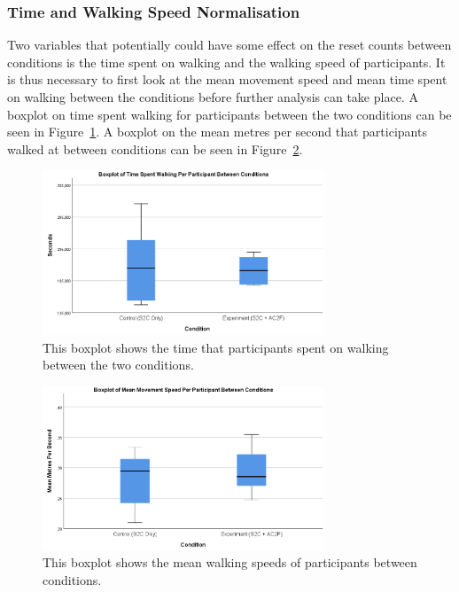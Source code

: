 \subsubsection{Time and Walking Speed Normalisation}
Two variables that potentially could have some effect on the reset counts between conditions is the time spent on walking and the walking speed of participants. It is thus necessary to first look at the mean movement speed and mean time spent on walking between the conditions before further analysis can take place. A boxplot on time spent walking for participants between the two conditions can be seen in Figure~\ref{fig:TimeSpentWalkingBetweenConditions}. A boxplot on the mean metres per second that participants walked at between conditions can be seen in Figure~\ref{fig:ex2mps}.

\begin{figure}[tbph]
    \centering
    \includegraphics[width=0.75\textwidth]{figures/graphs/TimeSpentWalkingBetweenConditionsBoxPlot.png}
    \caption[Boxplot of Time Spent Walking Between Conditions in Experiment 2]{This boxplot shows the time that participants spent on walking between the two conditions.}
    \label{fig:TimeSpentWalkingBetweenConditions}
\end{figure}

\begin{figure}[tbph]
    \centering
    \includegraphics[width=0.75\textwidth]{figures/graphs/mpsBoxplot.png}
    \caption[Boxplot of Mean Walking Speed Between Conditions in Experiment 2]{This boxplot shows the mean walking speeds of participants between conditions.}
    \label{fig:ex2mps}
\end{figure}

